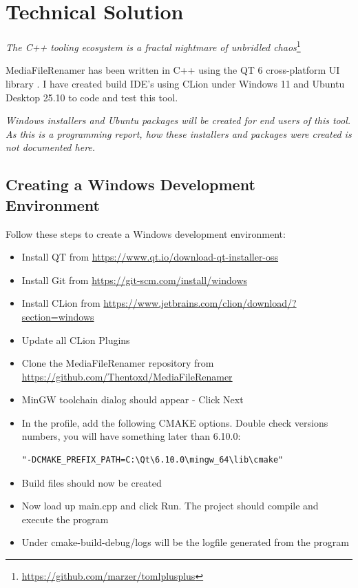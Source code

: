 \documentclass[11pt]{article}
\begin{document}
%


%

\section{Technical Solution}

\begin{center}
\textit{The C++ tooling ecosystem is a fractal nightmare of unbridled chaos}\footnote{\url{https://github.com/marzer/tomlplusplus}}
\end{center}

\vspace*{0.25cm}

MediaFileRenamer has been written in C++ using the QT 6 cross-platform UI library \cite{QT}.
I have created build IDE's using CLion under Windows 11 and Ubuntu Desktop 25.10 to code and test this tool.

\linebreak
\textit{Windows installers and Ubuntu packages will be created for end users of this tool.
As this is a programming report, how these installers and packages were created is not documented here.}

\subsection{Creating a Windows Development Environment}
Follow these steps to create a Windows development environment:
\begin{itemize}
    \item Install QT from \url{https://www.qt.io/download-qt-installer-oss}
    \item Install Git from \url{https://git-scm.com/install/windows}
    \item Install CLion from \url{https://www.jetbrains.com/clion/download/?section=windows}
    \item Update all CLion Plugins
    \item Clone the MediaFileRenamer repository from \url{https://github.com/Thentoxd/MediaFileRenamer}
    \item MinGW toolchain dialog should appear - Click Next
    \item In the profile, add the following CMAKE options. Double check versions numbers, you will have something later than 6.10.0: \begin{verbatim}"-DCMAKE_PREFIX_PATH=C:\Qt\6.10.0\mingw_64\lib\cmake"\end{verbatim}
    \item Build files should now be created
    \item Now load up main.cpp and click Run. The project should compile and execute the program
    \item Under cmake-build-debug/logs will be the logfile generated from the program
\end{itemize}
\end{document}
